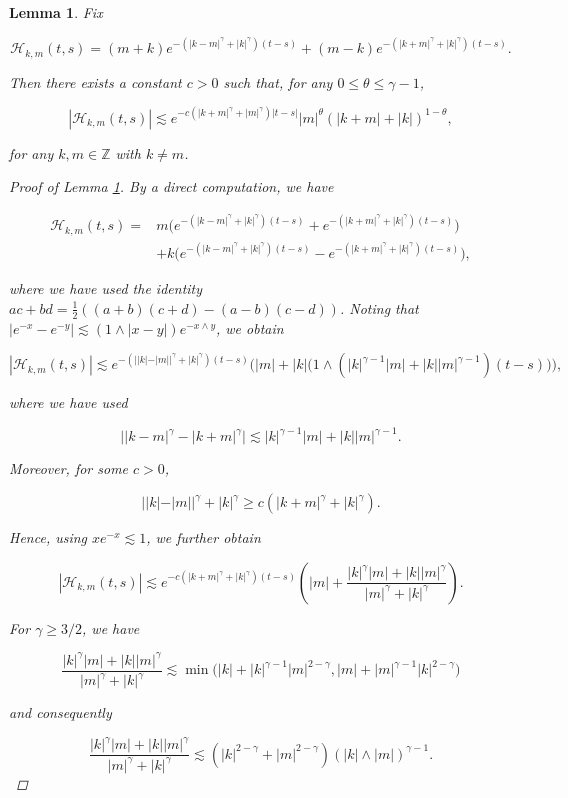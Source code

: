 \documentclass[10pt,a4paper]{amsart}
\newtheorem{lemma}{Lemma}
\newcommand{\ml}{\mathcal}
\begin{document}
\begin{lemma}\label{le;package}
Fix

$$
\ml H_{k,m}(t,s)
=(m+k)e^{-(|k-m|^\gamma+|k|^\gamma)(t-s)}
+(m-k)e^{-(|k+m|^\gamma+|k|^\gamma)(t-s)}.
$$

Then there exists a constant \(c>0\) such that, for any \(0\leq\theta\leq\gamma-1\),

$$
|\ml H_{k,m}(t,s)|
\lesssim
e^{-c(|k+m|^\gamma+|m|^\gamma)|t-s|}
|m|^\theta (|k+m|+|k|)^{1-\theta},
$$

for any \(k,m\in\mathbb Z\) with \(k\neq m\).

\begin{proof}[Proof of Lemma \ref{le;package}]
By a direct computation, we have

$$
\begin{aligned}
\ml H_{k,m}(t,s)
={}&m\Big(e^{-(|k-m|^\gamma+|k|^\gamma)(t-s)}
+e^{-(|k+m|^\gamma+|k|^\gamma)(t-s)}\Big)\\
&+k\Big(e^{-(|k-m|^\gamma+|k|^\gamma)(t-s)}
-e^{-(|k+m|^\gamma+|k|^\gamma)(t-s)}\Big),
\end{aligned}
$$

where we have used the identity
\(ac+bd=\frac12((a+b)(c+d)-(a-b)(c-d))\). Noting that
\(|e^{-x}-e^{-y}|\lesssim(1\wedge|x-y|)e^{-x\wedge y}\), we obtain

$$
|\ml H_{k,m}(t,s)|
\lesssim
e^{-(||k|-|m||^\gamma+|k|^\gamma)(t-s)}
\Big(
|m|+|k|\big(1\wedge
(|k|^{\gamma-1}|m|+|k||m|^{\gamma-1})(t-s)\big)
\Big),
$$

where we have used

$$
\big||k-m|^\gamma-|k+m|^\gamma\big|
\lesssim |k|^{\gamma-1}|m|+|k||m|^{\gamma-1}.
$$

Moreover, for some \(c>0\),

$$
||k|-|m||^\gamma+|k|^\gamma
\geq c(|k+m|^\gamma+|k|^\gamma).
$$

Hence, using \(xe^{-x}\lesssim1\), we further obtain

$$
|\ml H_{k,m}(t,s)|
\lesssim
e^{-c(|k+m|^\gamma+|k|^\gamma)(t-s)}
\left(
|m|+
\frac{|k|^\gamma|m|+|k||m|^\gamma}
{|m|^\gamma+|k|^\gamma}
\right).
$$

For \(\gamma\geq3/2\), we have

$$
\frac{|k|^\gamma|m|+|k||m|^\gamma}
{|m|^\gamma+|k|^\gamma}
\lesssim
\min\big(
|k|+|k|^{\gamma-1}|m|^{2-\gamma},
|m|+|m|^{\gamma-1}|k|^{2-\gamma}
\big)
$$

and consequently

$$
\frac{|k|^\gamma|m|+|k||m|^\gamma}
{|m|^\gamma+|k|^\gamma}
\lesssim
(|k|^{2-\gamma}+|m|^{2-\gamma})
(|k|\wedge|m|)^{\gamma-1}.
$$


\end{proof}
\end{lemma}
\end{document}
